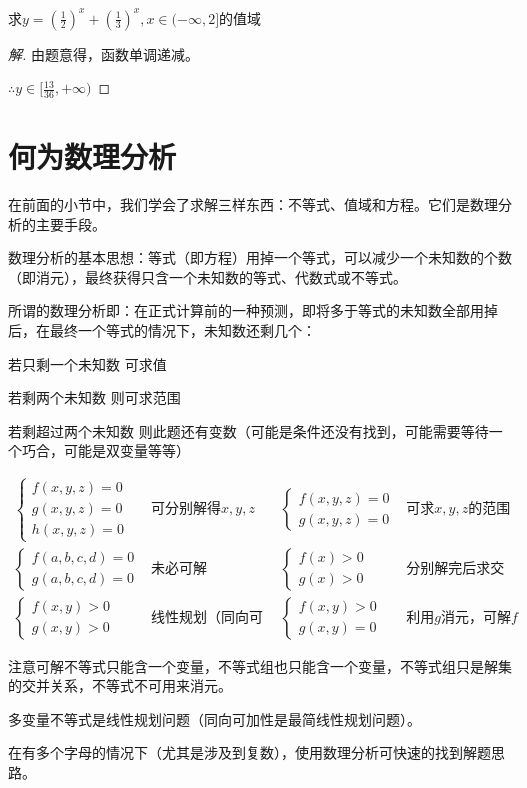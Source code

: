 \begin{example}
	求$y=(\frac{1}{2})^x+(\frac{1}{3})^x,x\in(-\infty,2]$的值域
\end{example}
\begin{proof}[解]
	由题意得，函数单调递减。

	$\therefore y\in[\frac{13}{36},+\infty)$
\end{proof}

\section{何为数理分析}
在前面的小节中，我们学会了求解三样东西：不等式、值域和方程。它们是数理分析的主要手段。

数理分析的基本思想：等式（即方程）用掉一个等式，可以减少一个未知数的个数（即消元），最终获得只含一个未知数的等式、代数式或不等式。

所谓的数理分析即：在正式计算前的一种预测，即将多于等式的未知数全部用掉后，在最终一个等式的情况下，未知数还剩几个：

\begin{desclist}
	\item[若只剩一个未知数] 可求值
	\item[若剩两个未知数] 则可求范围
	\item[若剩超过两个未知数] 则此题还有变数（可能是条件还没有找到，可能需要等待一个巧合，可能是双变量等等）
\end{desclist}
\[\begin{aligned}
	\begin{cases}
		f(x,y,z)=0 \\
		g(x,y,z)=0 \\
		h(x,y,z)=0
	\end{cases}&\text{可分别解得$x,y,z$}
	&\begin{cases}
		f(x,y,z)=0 \\
		g(x,y,z)=0
	\end{cases}&\text{可求$x,y,z$的范围} \\
	\begin{cases}
		f(a,b,c,d)=0 \\
		g(a,b,c,d)=0
	\end{cases}&\text{未必可解}
	&\begin{cases}
		f(x)>0 \\
		g(x)>0
	\end{cases}&\text{分别解完后求交集} \\
	\begin{cases}
		f(x,y)>0 \\
		g(x,y)>0
	\end{cases}&\text{线性规划（同向可加）}
	&\begin{cases}
		f(x,y)>0 \\
		g(x,y)=0
	\end{cases}&\text{利用$g$消元，可解$f$}
\end{aligned}\]

注意可解不等式只能含一个变量，不等式组也只能含一个变量，不等式组只是解集的交并关系，不等式不可用来消元。

多变量不等式是线性规划问题（同向可加性是最简线性规划问题）。

在有多个字母的情况下（尤其是涉及到复数），使用数理分析可快速的找到解题思路。
